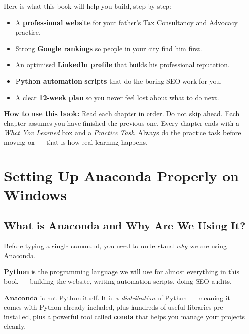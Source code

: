 \documentclass[12pt, a4paper]{book}
\begin{document}
\bigskip
Here is what this book will help you build, step by step:

\begin{itemize}[leftmargin=1.5em]
  \item A \textbf{professional website} for your father's Tax Consultancy and Advocacy practice.
  \item Strong \textbf{Google rankings} so people in your city find him first.
  \item An optimised \textbf{LinkedIn profile} that builds his professional reputation.
  \item \textbf{Python automation scripts} that do the boring SEO work for you.
  \item A clear \textbf{12-week plan} so you never feel lost about what to do next.
\end{itemize}

\bigskip
\begin{tcolorbox}[notebox]
\textbf{How to use this book:} Read each chapter in order. Do not skip ahead.
Each chapter assumes you have finished the previous one.
Every chapter ends with a \emph{What You Learned} box and a \emph{Practice Task}.
Always do the practice task before moving on --- that is how real learning happens.
\end{tcolorbox}

\chapter{Setting Up Anaconda Properly on Windows}

\section{What is Anaconda and Why Are We Using It?}

Before typing a single command, you need to understand \emph{why} we are using Anaconda.

\textbf{Python} is the programming language we will use for almost everything in this book ---
building the website, writing automation scripts, doing SEO audits.

\textbf{Anaconda} is not Python itself. It is a \emph{distribution} of Python ---
meaning it comes with Python already included, plus hundreds of useful libraries
pre-installed, plus a powerful tool called \textbf{conda} that helps you manage
your projects cleanly.
\end{document}
